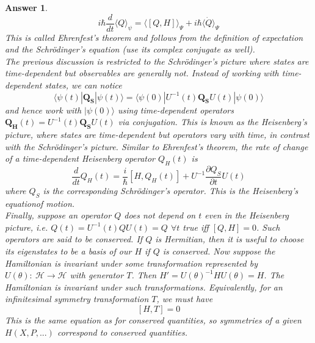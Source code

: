 \documentclass[a4paper]{article}
\newtheorem{ans}{Answer}[subsection]
\theoremstyle{new}
\begin{document}
\begin{ans}
$$i\hbar\frac{d}{dt}\langle Q\rangle_\psi=\langle [Q,H]\rangle_\Psi+i\hbar\langle\dot{Q}\rangle_\Psi$$
This is called Ehrenfest's theorem and follows from the definition of expectation and the Schr\"{o}dinger's equation (use its complex conjugate as well).\\[5pt]
The previous discussion is restricted to the Schr\"{o}dinger's picture where states are time-dependent but observables are generally not. Instead of working with time-dependent states, we can notice $$\langle\psi(t)|\mathbf{Q_S}|\psi(t)\rangle=\langle\psi(0)|U^{-1}(t)\mathbf{Q_S}U(t)|\psi(0)\rangle$$ and hence work with $|\psi(0)\rangle$ using time-dependent operators $\mathbf{Q_H}(t)=U^{-1}(t)\mathbf{Q_S}U(t)$ via conjugation. This is known as the Heisenberg's picture, where states are time-dependent but operators vary with time, in contrast with the Schr\"{o}dinger's picture. Similar to Ehrenfest's theorem, the rate of change of a time-dependent Heisenberg operator $Q_H(t)$ is
$$\frac{d}{dt}Q_H(t)=\frac{i}{\hbar}[H,Q_H(t)]+U^{-1}\frac{\partial Q_S}{\partial t}U(t)$$
where $Q_S$ is the corresponding Schr\"{o}dinger's operator. This is the Heisenberg's equationof motion.\\[5pt]
Finally, suppose an operator $Q$ does not depend on $t$ even in the Heisenberg picture, i.e. $Q(t)=U^{-1}(t)QU(t)=Q$ $\forall t$ true iff $[Q,H]=0$. Such operators are said to be conserved. If $Q$ is Hermitian, then it is useful to choose its eigenstates to be a basis of our $H$ if $Q$ is conserved. Now suppose the Hamiltonian is invariant under some transformation represented by $U(\theta):~\mathcal{H}\rightarrow\mathcal{H}$ with generator $T$. Then $H'=U(\theta)^{-1}HU(\theta)=H$. The Hamiltonian is invariant under such transformations. Equivalently, for an infinitesimal symmetry transformation $T$, we must have
$$[H,T]=0$$
This is the same equation as for conserved quantities, so symmetries of a given $H(X,P,...)$ correspond to conserved quantities.

\end{ans}
\end{document}
